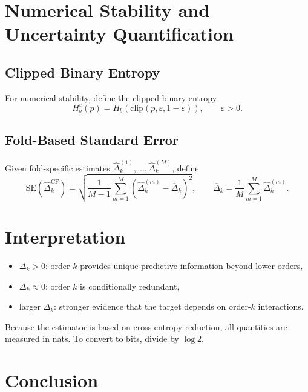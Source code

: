 \documentclass[11pt]{article}
\newcommand{\1}{\mathbf{1}}
\begin{document}
\section{Numerical Stability and Uncertainty Quantification}

\subsection{Clipped Binary Entropy}

For numerical stability, define the clipped binary entropy
\begin{equation}
H_b^{\varepsilon}(p)
=
H_b\!\left(\mathrm{clip}(p,\varepsilon,1-\varepsilon)\right),
\qquad \varepsilon > 0.
\label{eq:clipped_entropy}
\end{equation}

\subsection{Fold-Based Standard Error}

Given fold-specific estimates $\widehat{\Delta}_k^{(1)},\ldots,\widehat{\Delta}_k^{(M)}$, define
\begin{equation}
\mathrm{SE}\!\left(\widehat{\Delta}^{\mathrm{CF}}_k\right)
=
\sqrt{
\frac{1}{M-1}
\sum_{m=1}^M
\left(
\widehat{\Delta}^{(m)}_k
-
\overline{\Delta}_k
\right)^2
},
\qquad
\overline{\Delta}_k = \frac{1}{M}\sum_{m=1}^M \widehat{\Delta}^{(m)}_k.
\label{eq:fold_se}
\end{equation}

\section{Interpretation}

\begin{itemize}[leftmargin=1.5em]
    \item $\Delta_k > 0$: order $k$ provides unique predictive information beyond lower orders,
    \item $\Delta_k \approx 0$: order $k$ is conditionally redundant,
    \item larger $\Delta_k$: stronger evidence that the target depends on order-$k$ interactions.
\end{itemize}

Because the estimator is based on cross-entropy reduction, all quantities are measured in nats.
To convert to bits, divide by $\log 2$.

\section{Conclusion}
\end{document}
